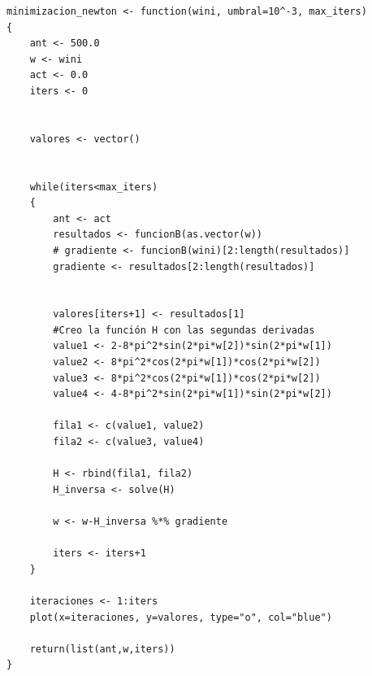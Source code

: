 	 \begin{lstlisting}
minimizacion_newton <- function(wini, umbral=10^-3, max_iters)
{
	ant <- 500.0
	w <- wini
	act <- 0.0
	iters <- 0
	
	
	valores <- vector()
	
	
	while(iters<max_iters)
	{
		ant <- act
		resultados <- funcionB(as.vector(w))
		# gradiente <- funcionB(wini)[2:length(resultados)]
		gradiente <- resultados[2:length(resultados)]
		
		
		valores[iters+1] <- resultados[1]
		#Creo la función H con las segundas derivadas
		value1 <- 2-8*pi^2*sin(2*pi*w[2])*sin(2*pi*w[1])
		value2 <- 8*pi^2*cos(2*pi*w[1])*cos(2*pi*w[2])
		value3 <- 8*pi^2*cos(2*pi*w[1])*cos(2*pi*w[2])
		value4 <- 4-8*pi^2*sin(2*pi*w[1])*sin(2*pi*w[2])
		
		fila1 <- c(value1, value2)
		fila2 <- c(value3, value4)
		
		H <- rbind(fila1, fila2)
		H_inversa <- solve(H)
		
		w <- w-H_inversa %*% gradiente
		
		iters <- iters+1
	}
	
	iteraciones <- 1:iters
	plot(x=iteraciones, y=valores, type="o", col="blue")
	
	return(list(ant,w,iters))
}
	 \end{lstlisting}
	 
